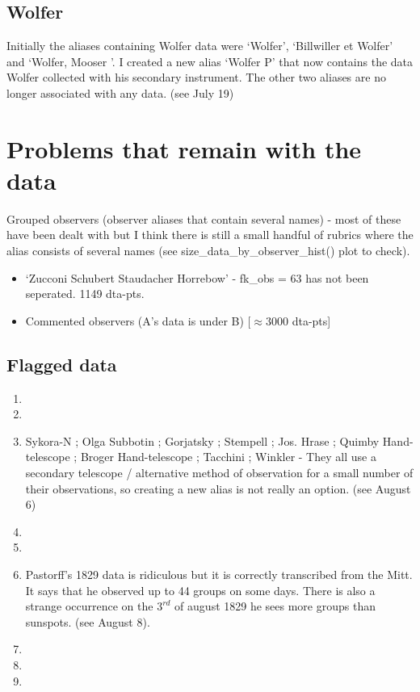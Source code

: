 \documentclass[12pt]{article}
\begin{document}
\subsection{Wolfer}
Initially the aliases containing Wolfer data were `Wolfer', `Billwiller et Wolfer' and `Wolfer, Mooser '. I created a new alias `Wolfer P' that now contains the data Wolfer collected with his secondary instrument. The other two aliases are no longer associated with any data. (see July 19)


\section{Problems that remain with the data}
Grouped observers (observer aliases that contain several names) - most of these have been dealt with but I think there is still a small handful of rubrics where the alias consists of several names (see size\_data\_by\_observer\_hist() plot to check).
\begin{itemize}
    \item `Zucconi Schubert Staudacher Horrebow' - fk\_obs = 63 has not been seperated. 1149 dta-pts.
\end{itemize}

\begin{itemize}
    \item Commented observers (A's data is under B) [$\approx 3000$ dta-pts]
\end{itemize}

\subsection{Flagged data}
\begin{enumerate}
    \item 
    \item 
    \item Sykora-N ; Olga Subbotin ; Gorjatsky ; Stempell ; Jos. Hrase ; Quimby Hand-telescope ; Broger Hand-telescope ; Tacchini ; Winkler - They all use a secondary telescope / alternative method of observation for a small number of their observations, so creating a new alias is not really an option. (see August 6)
    \item 
    \item 
    \item Pastorff's 1829 data is ridiculous but it is correctly transcribed from the Mitt. It says that he observed up to 44 groups on some days. There is also a strange occurrence on the $3^{rd}$ of august 1829 he sees more groups than sunspots. (see August 8). 
    \item 
    \item 
    \item 
\end{enumerate}
\end{document}

